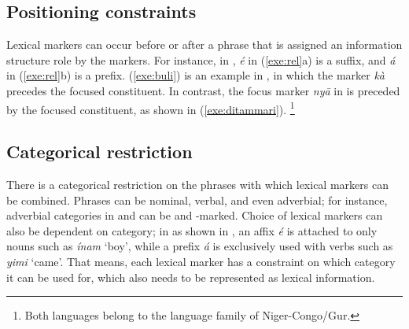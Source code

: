 \subsection{Positioning constraints}
\label{4:ssec:position}


Lexical markers can occur before or after a phrase that is assigned an
information structure role by the markers. For
instance, in , \textit{{\'e}} in (\ref{exe:rel}a) is a
suffix, and \textit{{\'a}} in (\ref{exe:rel}b) is a prefix.
(\ref{exe:buli}) is an example in , in which the 
marker \textit{k\`{a}} precedes the focused constituent. In
contrast, the focus marker \textit{ny\={a}} in  is
preceded by the focused constituent, as shown in
(\ref{exe:ditammari}). \footnote{Both languages belong to the language
  family of Niger-Congo/Gur.}







\subsection{Categorical restriction}
\label{4:ssec:categorical}


There is a categorical restriction on the phrases with which lexical
markers can be combined. Phrases can be nominal, verbal, and even
adverbial; for instance, adverbial categories in  and
 can be \wa and \onun-marked.  Choice of lexical markers
can also be dependent on category; in  as shown in
, an affix \textit{{\'e}} is attached to only nouns
such as \textit{{\'i}nam} `boy', while a prefix \textit{{\'a}} is
exclusively used with verbs such as \textit{yimi} `came'. That means, each lexical marker has a constraint on which
category it can be used for, which also needs to be represented as
lexical information.


